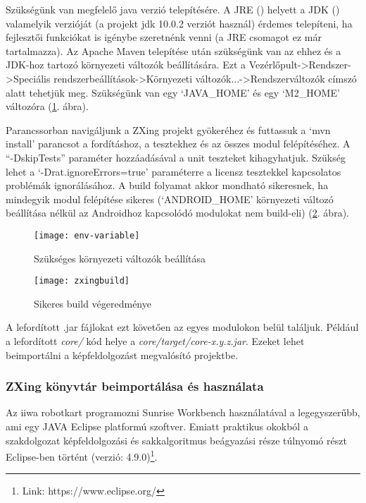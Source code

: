 \documentclass[../documentation.tex]{subfiles}
\begin{document}
Szükségünk van megfelelő java verzió telepítésére. A JRE () helyett a JDK () valamelyik verzióját (a projekt jdk 10.0.2 verziót használ) érdemes telepíteni, ha fejlesztői funkciókat is igénybe szeretnénk venni (a JRE csomagot ez már tartalmazza). Az Apache Maven telepítése után szükségünk van az ehhez és a JDK-hoz tartozó környezeti változók beállítására. Ezt a Vezérlőpult->Rendszer->Speciális rendszerbeállítások->Környezeti változók...->Rendszerváltozók címszó alatt tehetjük meg. Szükségünk van egy `JAVA\_HOME' és egy `M2\_HOME' változóra (\ref{fig:envvar}. ábra).

Parancssorban navigáljunk a ZXing projekt gyökeréhez és futtassuk a `mvn install' parancsot a fordításhoz, a tesztekhez és az összes modul felépítéséhez. A ``-DskipTests'' paraméter hozzáadásával a unit teszteket kihagyhatjuk. Szükség lehet a `-Drat.ignoreErrors=true' paraméterre a licensz tesztekkel kapcsolatos problémák ignorálásához. A build folyamat akkor mondható sikeresnek, ha mindegyik modul felépítése sikeres (`ANDROID\_HOME' környezeti változó beállítása nélkül az Androidhoz kapcsolódó modulokat nem build-eli) (\ref{fig:buildsuccess}. ábra).

\begin{figure}[h]
\centering
\texttt{[image: env-variable]}
\caption{Szükséges környezeti változók beállítása}
\label{fig:envvar}
\end{figure}

\begin{figure}[h]
\centering
\texttt{[image: zxingbuild]}
\caption{Sikeres build végeredménye}
\label{fig:buildsuccess}
\end{figure}

A lefordított .jar fájlokat ezt követően az egyes modulokon belül találjuk. Például a lefordított \textit{core/} kód helye a \textit{core/target/core-x.y.z.jar}. Ezeket lehet beimportálni a képfeldolgozást megvalósító projektbe.

\subsubsection{ZXing könyvtár beimportálása és használata}
Az iiwa robotkart programozni Sunrise Workbench használatával a legegyszerűbb, ami egy JAVA Eclipse platformú szoftver. Emiatt praktikus okokból a szakdolgozat képfeldolgozási és sakkalgoritmus beágyazási része túlnyomó részt Eclipse-ben történt (verzió: 4.9.0)\footnote{Link: https://www.eclipse.org/}.
\end{document}
